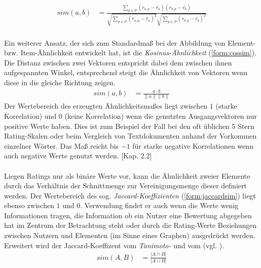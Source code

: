 \begin{align}
\label{form:pearsonsim}
sim(a,b) & = \frac{\sum_{p \in P} (r_{a,p}-\bar{r_a})(r_{b,p}-\bar{r_b})}{\sqrt{\sum_{p \in P} (r_{a,p}-\bar{r_a})^2 }\sqrt{\sum_{p \in P} (r_{b,p}-\bar{r_b})^2 }}
\end{align}

\paragraph{}\label{sec:cossim} Ein weiterer Ansatz, der sich zum Standardmaß bei der Abbildung von Element- bzw. Item-Ähnlichkeit entwickelt hat, ist die \textit{Kosinus-Ähnlichkeit} (\ref{form:cossim}). Die Distanz zwischen zwei Vektoren entspricht dabei dem zwischen ihnen aufgespannten Winkel, entsprechend steigt die Ähnlichkeit von Vektoren wenn diese in die gleiche Richtung zeigen. 
\begin{align}
\label{form:cossim}
sim(a,b) & = \frac{a \cdot b}{\|a\| \|b\|}
\end{align}
Der Wertebereich des erzeugten Ähnlichkeitsmaßes liegt zwischen $1$ (starke Korrelation) und $0$ (keine Korrelation) wenn die genutzten Ausgangsvektoren nur positive Werte haben. Dies ist zum Beispiel der Fall bei den oft üblichen 5 Stern Rating-Skalen oder beim Vergleich von Textdokumenten anhand der Vorkommen einzelner Wörter. Das Maß reicht bis $-1$ für starke negative Korrelationen wenn auch negative Werte genutzt werden. \citep{rs}[Kap. 2.2]

\paragraph{} Liegen Ratings nur als binäre Werte vor, kann die Ähnlichkeit zweier Elemente durch das Verhältnis der Schnittmenge zur Vereinigungsmenge dieser definiert werden. Der Wertebereich des sog. \textit{Jaccard-Koeffizienten} (\ref{form:jaccardsim}) liegt ebenso zwischen $1$ und $0$. Verwendung findet er auch wenn die Werte wenig Informationen tragen, die Information ob ein Nutzer eine Bewertung abgegeben hat im Zentrum der Betrachtung steht oder durch die Rating-Werte Beziehungen zwischen Nutzern und Elementen (im Sinne eines Graphen) ausgedrückt werden. Erweitert wird der Jaccard-Koeffizent vom \textit{Tanimoto-} und vom \textit{} (vgl. \citep{bogers09}). \citep[Kap. 3.1]{rs} \citep{pci}
\begin{align}
\label{form:jaccardsim}
sim(A,B) & = \frac{|A \cap B|}{|A \cup B|}
\end{align}

